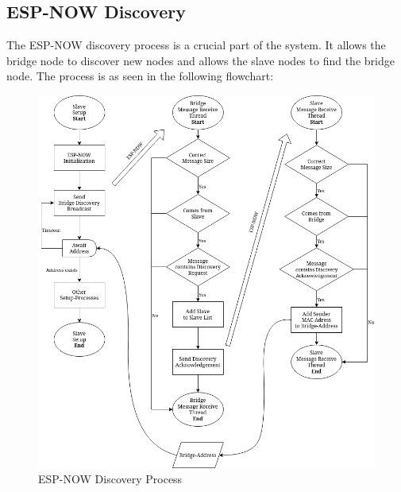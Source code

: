         \subsection{ESP-NOW Discovery} \label{sec:espnow_discovery}
        The ESP-NOW discovery process is a crucial part of the system. It allows the
        bridge node to discover new nodes and allows the slave nodes to find the bridge
        node. The process is as seen in the following flowchart:
        \begin{figure}
            \centering
            \includegraphics[width=\textwidth]{topics/flowcharts/ESP-NOW-Discovery.drawio.png}
            \caption{ESP-NOW Discovery Process}
            \label{fig:espnow_discovery}
        \end{figure}